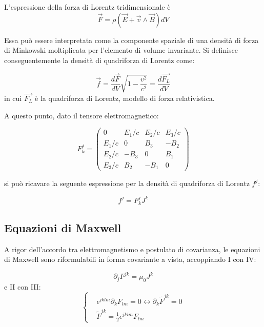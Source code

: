 \documentclass{article}
\begin{document}
L'espressione della forza di Lorentz tridimensionale è
\begin{equation}
    \vec{F}=\rho(\vec{E}+\vec{v}\wedge\vec{B})dV
\end{equation}

Essa può essere interpretata come la componente spaziale di una densità di forza di Minkowski moltiplicata per l'elemento di volume invariante.
Si definisce conseguentemente la densità di quadriforza di Lorentz come:

\begin{equation}
    \vec{f}=\frac{d \vec{F}}{dV}\sqrt{1-\frac{v^2}{c^2}}= \frac{d \vec{F_L}}{dV}
\end{equation}
in cui $\vec{F_L}$ è la quadriforza di Lorentz, modello di forza relativistica.

A questo punto, dato il tensore elettromagnetico:

\begin{equation}
    F^j_k=
    \begin{pmatrix}
        0     & E_1/c & E_2/c & E_3/c \\
        E_1/c & 0     & B_3   & -B_2  \\
        E_2/c & -B_3  & 0     & B_1   \\
        E_3/c & B_2   & -B_1  & 0
    \end{pmatrix}
\end{equation}

si può ricavare la seguente espressione per la densità di quadriforza di Lorentz $f^j$:

\begin{equation}
    f^j=F^j_k J^k
\end{equation}

\subsection{Equazioni di Maxwell}
A rigor dell'accordo tra elettromagnetismo e postulato di covarianza, le equazioni di Maxwell sono riformulabili in forma covariante a vista,
accoppiando I con IV:

\begin{equation}
    \partial_j F^{jk}=\mu_0 J^k
\end{equation}
e II con III:
\begin{equation}
    \left\{
    \begin{aligned}
         & \epsilon^{jklm}\partial_k F_{lm}=0 \leftrightarrow \partial_k \tilde F^{jk}=0 \\
         & \tilde F^{jk}=\frac{1}{2}\epsilon^{jklm}F_{lm}
    \end{aligned}
    \right.
\end{equation}
\end{document}
